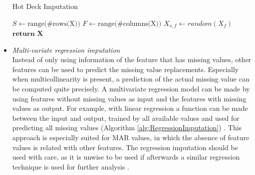 \documentclass[10pt,a4paper]{report}
\begin{document}
\begin{itemize}
		\begin{algorithm}[H]
			\caption{Hot Deck Imputation}\label{alg:HotDeckImputation}
			\begin{algorithmic}[1]
				\State $S \gets \text{range(\#rows(X))}$ 	
				\State $F \gets \text{range(\#columns(X))}$ 	
				 					
				 				 			
				\State $X_{s,f} \gets \textit{random}(X_f)$	
				\EndIf
				\EndFor
				\State $\textbf{return X}$
				\EndProcedure
			\end{algorithmic}
		\end{algorithm}	
		
		\item \textit{Multi-variate regression imputation} \\
		Instead of only using information of the feature that has missing values, other features can be used to predict the missing value replacements. Especially when multicollinearity is present, a prediction of the actual missing value can be computed quite precisely. A multivariate regression model can be made by using features without missing values as input and the features with missing values as output. For example, with linear regression a function can be made between the input and output, trained by all available values and used for predicting all missing values (Algorithm \ref{alg:RegressionImputation}) \cite{raghunathan2001multivariate}. This approach is especially suited for MAR values, in which the absence of feature values is related with other features. The regression imputation should be used with care, as it is unwise to be used if afterwards a similar regression technique is used for further analysis \cite{donders2006gentle}.
		

\end{itemize}
\end{document}
